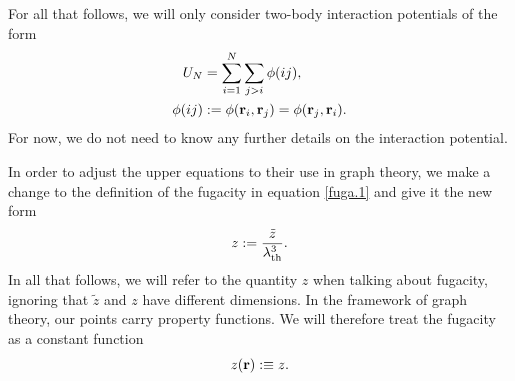 \documentclass[8.5pt,twoside,twocolumn]{article}
\newcommand\di{\te{d}}
\newcommand\dr{\di\r}
\newcommand\lath{\enmat{\la_\te{th}}}
\renewcommand\r{\bo r}
\theoremstyle{standard}
\begin{document}

For all that follows, we will only consider two-body interaction potentials of the form
\begin{equation}
\begin{aligned}
U_N &= \sum_{i=1}^N \sum_{j>i} \phi(ij), \\
\phi(ij)&:=\phi(\r_i,\r_j) = \phi(\r_j,\r_i).
\label{potential}
\end{aligned}
\end{equation}
For now, we do not need to know any further details on the interaction potential.

In order to adjust the upper equations to their use in graph theory, we make a change to the definition
of the fugacity in equation \eqref{fuga.1} and give it the new form
\begin{equation}
z:=\frac {\tilde z} {\lath^3} .
\label{fuga.2}
\end{equation}
In all that follows, we will refer to the quantity $z$ when talking about fugacity, ignoring that
$\tilde z$ and $z$ have different dimensions. 
In the framework of graph theory, our points carry property functions. We will therefore treat the fugacity as a constant function
\begin{equation}
z(\r):\equiv z.
\label{zconst}
\end{equation} 
\end{document}
